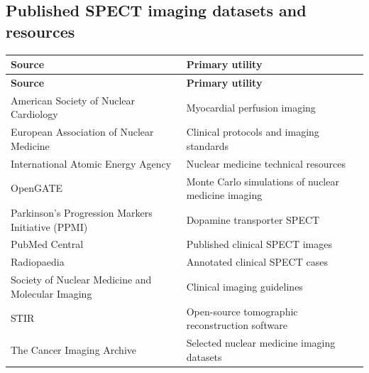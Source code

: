 \subsection{Published SPECT imaging datasets and resources}
\begin{longtable}{@{}p{}p{}@{}}
\toprule
\textbf{Source} & \textbf{Primary utility} \\
\midrule
\endfirsthead
\toprule
\textbf{Source} & \textbf{Primary utility} \\
\midrule
\endhead
American Society of Nuclear Cardiology & Myocardial perfusion imaging \\
European Association of Nuclear Medicine & Clinical protocols and imaging standards \\
International Atomic Energy Agency & Nuclear medicine technical resources \\
OpenGATE & Monte Carlo simulations of nuclear medicine imaging \\
Parkinson's Progression Markers Initiative (PPMI) & Dopamine transporter SPECT \\
PubMed Central & Published clinical SPECT images \\
Radiopaedia & Annotated clinical SPECT cases \\
Society of Nuclear Medicine and Molecular Imaging & Clinical imaging guidelines \\
STIR & Open-source tomographic reconstruction software \\
The Cancer Imaging Archive & Selected nuclear medicine imaging datasets \\
\bottomrule
\end{longtable}

